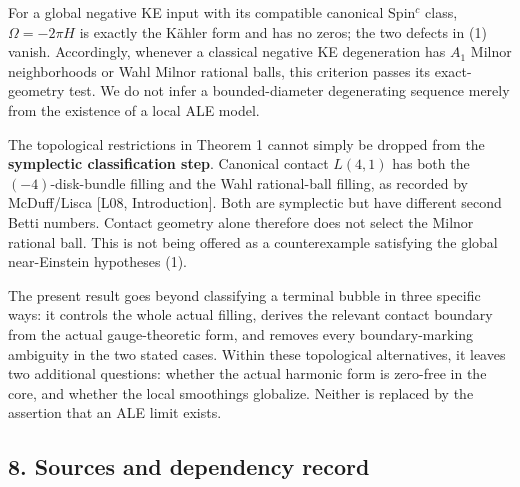 \documentclass[
  11pt,
]{article}
\begin{document}
For a global negative KE input with its compatible canonical Spin\(^c\)
class, \(\Omega=-2\pi H\) is exactly the Kähler form and has no zeros;
the two defects in (1) vanish. Accordingly, whenever a classical
negative KE degeneration has \(A_1\) Milnor neighborhoods or Wahl Milnor
rational balls, this criterion passes its exact-geometry test. We do not
infer a bounded-diameter degenerating sequence merely from the existence
of a local ALE model.

The topological restrictions in Theorem 1 cannot simply be dropped from
the \textbf{symplectic classification step}. Canonical contact
\(L(4,1)\) has both the \((-4)\)-disk-bundle filling and the Wahl
rational-ball filling, as recorded by McDuff/Lisca {[}L08,
Introduction{]}. Both are symplectic but have different second Betti
numbers. Contact geometry alone therefore does not select the Milnor
rational ball. This is not being offered as a counterexample satisfying
the global near-Einstein hypotheses (1).

The present result goes beyond classifying a terminal bubble in three
specific ways: it controls the whole actual filling, derives the
relevant contact boundary from the actual gauge-theoretic form, and
removes every boundary-marking ambiguity in the two stated cases. Within
these topological alternatives, it leaves two additional questions:
whether the actual harmonic form is zero-free in the core, and whether
the local smoothings globalize. Neither is replaced by the assertion
that an ALE limit exists.

\hypertarget{sources-and-dependency-record}{%
\subsection{8. Sources and dependency
record}\label{sources-and-dependency-record}}
\end{document}
